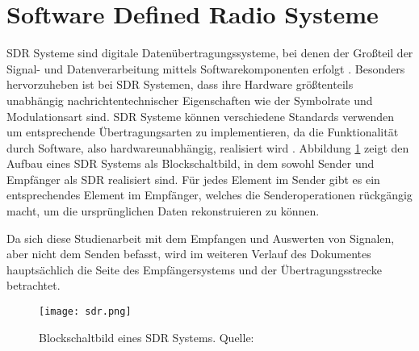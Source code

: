 \section{Software Defined Radio Systeme} 
\ac{SDR} Systeme sind digitale Datenübertragungssysteme, bei denen der Großteil der Signal- und Datenverarbeitung mittels Softwarekomponenten erfolgt \cite[Heuberger, e. a., S. 1]{Heuberger:2017}.
Besonders hervorzuheben ist bei \ac{SDR} Systemen, dass ihre Hardware größtenteils unabhängig nachrichtentechnischer Eigenschaften wie der Symbolrate und Modulationsart sind. \ac{SDR} Systeme können verschiedene Standards verwenden um entsprechende Übertragungsarten zu implementieren, da die Funktionalität durch Software, also hardwareunabhängig, realisiert wird \cite[Heuberger, e. a., S. 36]{Heuberger:2017}. \newline
Abbildung \ref{sdr-blockschaltbild} zeigt den Aufbau eines \ac{SDR} Systems als Blockschaltbild, in dem sowohl Sender und Empfänger als SDR realisiert sind.
Für jedes Element im Sender gibt es ein entsprechendes Element im Empfänger, welches die Senderoperationen rückgängig macht, um die ursprünglichen Daten rekonstruieren zu können.

Da sich diese Studienarbeit mit dem Empfangen und Auswerten von Signalen, aber nicht dem Senden befasst, wird im weiteren Verlauf des Dokumentes hauptsächlich die Seite des Empfängersystems und der Übertragungsstrecke betrachtet.

\begin{figure}[ht]
	\centering
	\texttt{[image: sdr.png]}
	\caption[Blockschaltbild eines SDR Systems]{Blockschaltbild eines SDR Systems. Quelle: \cite[Heuberger, e. a., S. 37]{Heuberger:2017}}
	\label{sdr-blockschaltbild}
\end{figure}

